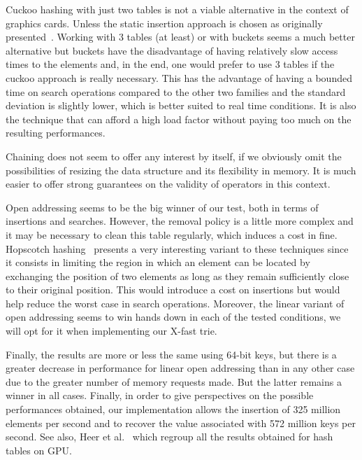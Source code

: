 Cuckoo hashing with just two tables is not a viable alternative in the context of graphics cards. Unless the static insertion approach is chosen as originally presented~\cite{alcantara2009real}. Working with 3 tables (at least) or with buckets seems a much better alternative but buckets have the disadvantage of having relatively slow access times to the elements and, in the end, one would prefer to use 3 tables if the cuckoo approach is really necessary. This has the advantage of having a bounded time on search operations compared to the other two families and the standard deviation is slightly lower, which is better suited to real time conditions. It is also the technique that can afford a high load factor without paying too much on the resulting performances.

Chaining does not seem to offer any interest by itself, if we obviously omit the possibilities of resizing the data structure and its flexibility in memory. It is much easier to offer strong guarantees on the validity of operators in this context.

Open addressing seems to be the big winner of our test, both in terms of insertions and searches. However, the removal policy is a little more complex and it may be necessary to clean this table regularly, which induces a cost in fine. Hopscotch hashing~\cite{herlihy2008hopscotch} presents a very interesting variant to these techniques since it consists in limiting the region in which an element can be located by exchanging the position of two elements as long as they remain sufficiently close to their original position. This would introduce a cost on insertions but would help reduce the worst case in search operations. Moreover, the linear variant of open addressing seems to win hands down in each of the tested conditions, we will opt for it when implementing our X-fast trie.

Finally, the results are more or less the same using 64-bit keys, but there is a greater decrease in performance for linear open addressing than in any other case due to the greater number of memory requests made. But the latter remains a winner in all cases. Finally, in order to give perspectives on the possible performances obtained, our implementation allows the insertion of 325 million elements per second and to recover the value associated with 572 million keys per second. See also, Heer et al.~\cite{heerdata} which regroup all the results obtained for hash tables on GPU.
